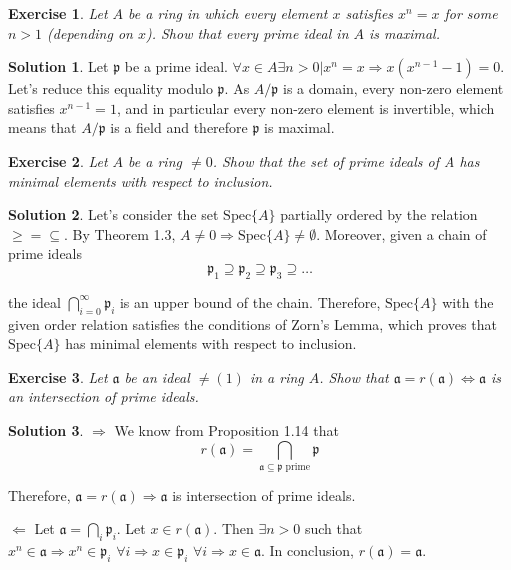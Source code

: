 \documentclass[12pt]{article}
\newcommand{\imp}{\ensuremath{\Rightarrow}}
\newtheorem{ex}{Exercise}[section]
\theoremstyle{definition}
\newtheorem*{sol}{Solution}
\begin{document}
\begin{ex}
	Let $A$ be a ring in which every element $x$ satisfies $x^n = x$ for some $n > 1$ (depending on $x$). Show that every prime ideal in $A$ is maximal.
\end{ex}

\begin{sol}
	Let $\mathfrak{p}$ be a prime ideal. $\forall x \in A \exists n > 0 | x^n = x \imp x(x^{n-1} -1) = 0$. Let's reduce this equality modulo $\mathfrak{p}$. As $A/\mathfrak{p}$ is a domain, every non-zero element satisfies $x^{n-1} = 1$, and in particular every non-zero element is invertible, which means that $A/\mathfrak{p}$ is a field and therefore $\mathfrak{p}$ is maximal.
\end{sol}

\begin{ex}
 Let $A$ be a ring $\neq 0$. Show that the set of prime ideals of A has minimal elements with respect to inclusion.
\end{ex}

\begin{sol}
	Let's consider the set $\text{Spec}\{A\}$ partially ordered by the relation $\geq = \subseteq$. By Theorem 1.3, $A \neq 0 \imp \text{Spec}\{A\} \neq \emptyset$. Moreover, given a chain of prime ideals 
	\[
		\mathfrak{p}_1 \supseteq \mathfrak{p}_2 \supseteq \mathfrak{p}_3 \supseteq \dots
	\]

	the ideal $\bigcap_{i = 0}^\infty \mathfrak{p}_i$ is an upper bound of the chain. Therefore, $\text{Spec}\{A\}$ with the given order relation satisfies the conditions of Zorn's Lemma, which proves that $\text{Spec}\{A\}$ has minimal elements with respect to inclusion.
\end{sol}

\begin{ex}
	Let $\mathfrak{a}$ be an ideal $\neq (1)$ in a ring $A$. Show that $\mathfrak{a} = r(\mathfrak{a}) \iff \mathfrak{a}$ is an intersection of prime ideals.
\end{ex}

\begin{sol}
$\boxed{\Rightarrow}$ We know from Proposition 1.14 that
\[
r(\mathfrak{a}) = \bigcap_{\mathfrak{a} \subseteq \mathfrak{p} \text{ prime}} \mathfrak{p}
\]

Therefore, $\mathfrak{a} = r(\mathfrak{a}) \imp \mathfrak{a}$ is intersection of prime ideals.

$\boxed{\Leftarrow}$ Let $\mathfrak{a} = \bigcap_i \mathfrak{p}_i$. Let $x \in r(\mathfrak{a})$. Then $\exists n > 0$ such that $x^n \in \mathfrak{a} \imp x^n \in \mathfrak{p}_i \, \, \forall i \imp x \in \mathfrak{p}_i \, \, \forall i \imp x \in \mathfrak{a}$. In conclusion, $r(\mathfrak{a}) = \mathfrak{a}$.

\end{sol}
\end{document}
